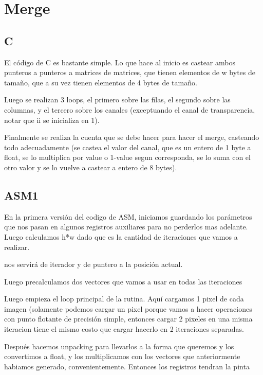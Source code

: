 \section{Merge}

\subsection{C}
El código de C es bastante simple. Lo que hace al inicio es castear ambos punteros a punteros a matrices de matrices, que tienen elementos de w bytes de tamaño, que a su vez tienen elementos de 4 bytes de tamaño.

Luego se realizan 3 loops, el primero sobre las filas, el segundo sobre las columnas, y el tercero sobre los canales (exceptuando el canal de transparencia, notar que ii se inicializa en 1).

Finalmente se realiza la cuenta que se debe hacer para hacer el merge, casteando todo adecuadamente (se castea el valor del canal, que es un entero de 1 byte a float, se lo multiplica por value o 1-value segun corresponda, se lo suma con el otro valor y se lo vuelve a castear a entero de 8 bytes).

\subsection{ASM1}

En la primera versión del codigo de ASM, iniciamos guardando los parámetros que nos pasan en algunos registros auxiliares para no perderlos mas adelante.
Luego calculamos h*w dado que es la cantidad de iteraciones que vamos a realizar.

\rcx nos servirá de iterador y \rbx de puntero a la posición actual.

Luego precalculamos dos vectores que vamos a usar en todas las iteraciones




Luego empieza el loop principal de la rutina. Aquí cargamos 1 pixel de cada imagen (solamente podemos cargar un pixel porque vamos a hacer operaciones con punto flotante de precisión simple, entonces cargar 2 pixeles en una misma iteracion tiene el mismo costo que cargar hacerlo en 2 iteraciones separadas.

Después hacemos unpacking para llevarlos a la forma que queremos y los convertimos a float, y los multiplicamos con los vectores que anteriormente habiamos generado, convenientemente. Entonces los registros tendran la pinta

